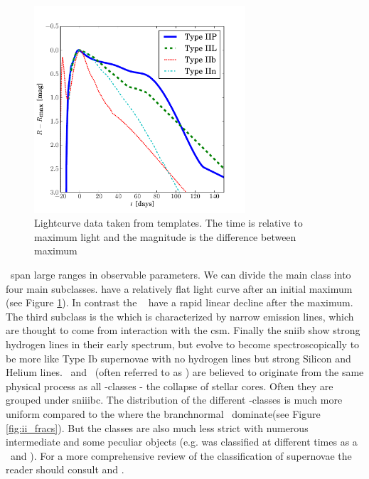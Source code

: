 \begin{figure}[htbp] %
   \centering
   \includegraphics[width=0.7\textwidth]{chapter_intro/plots/plot_li11_lc_type2.pdf} 
   \caption{Lightcurve data taken from \citet{2011MNRAS.412.1441L} templates. The time is relative to maximum light and the magnitude is the difference between maximum  }
   \label{fig:snii_lc}
\end{figure}

\sneii\ span large ranges in observable parameters. We can divide the main class into four main subclasses. \sniip \citep[][]{1979A&A....72..287B} have a relatively flat light curve after an initial maximum (see Figure \ref{fig:snii_lc}). In contrast the \sniil\ \citep{1990MNRAS.244..269S} have a rapid linear decline after the maximum. The third subclass is the \sniin which is characterized by narrow emission lines, which are thought to come from interaction with the \gls{csm}. Finally the \gls{sniib} show strong hydrogen lines in their early spectrum, but evolve to become spectroscopically to be more like Type Ib supernovae with no hydrogen lines but strong Silicon and Helium lines. \sneib\ and \sneic\ (often referred to as \sneibc) are believed to originate from the same physical process as all \snii-classes - the collapse of stellar cores. Often they are grouped under \gls{sniiibc}. The distribution of the different \snii-classes is much more uniform compared to the \sneia where the \gls{branchnormal} \sneia\ dominate(see Figure \ref{fig:ii_fracs}). But the classes are also much less strict with numerous intermediate and some peculiar objects (e.g.  was classified at different times as a \snib\ and \snic).  For a more comprehensive review of the classification of supernovae the reader should consult \citet{2003LNP...598...21T} and \citet{2007AIPC..937..187T}.

